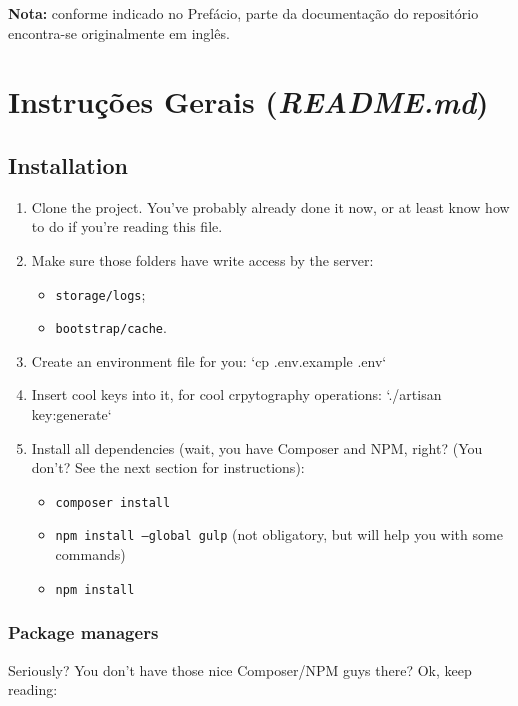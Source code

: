 \documentclass[12pt,a4paper,twoside,hyphens,english,brazil]{abntex2}
\begin{document}
{\begin{framed}
	\noindent
	\textbf{Nota:} conforme indicado no Prefácio, parte da documentação do repositório encontra-se originalmente em inglês.
\end{framed}

\section{Instruções Gerais (\emph{README.md})}

\begin{otherlanguage}{english}
\subsection{Installation}
\begin{enumerate}[itemsep=-1ex]
	\item Clone the project. You've probably already done it now, or at least know how to do if you're reading this file.
	\item Make sure those folders have write access by the server:
		\begin{itemize}[itemsep=-1ex,topsep=-1ex]
			\item \texttt{storage/logs};
			\item \texttt{bootstrap/cache}.
		\end{itemize}
	\item Create an environment file for you: `cp .env.example .env`
	\item Insert cool keys into it, for cool crpytography operations: `./artisan key:generate`
	\item Install all dependencies (wait, you have Composer and NPM, right? (You don't? See the next section for instructions):
		\begin{itemize}[itemsep=-1ex,topsep=-1ex]
			\item \texttt{composer install}
			\item \texttt{npm install --global gulp} (not obligatory, but will help you with some commands)
			\item \texttt{npm install}
		\end{itemize}
\end{enumerate}

\subsubsection{Package managers}
Seriously? You don't have those nice Composer/NPM guys there? Ok, keep reading:


\end{otherlanguage}}
\end{document}
